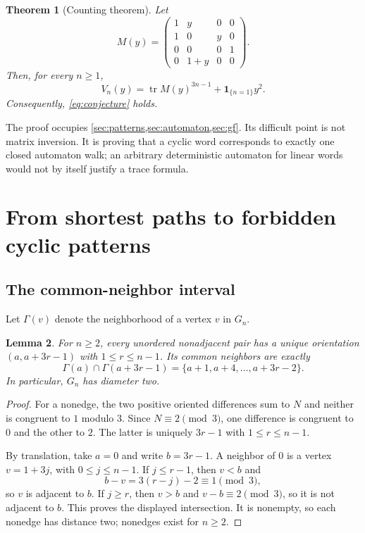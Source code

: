 \documentclass[11pt,a4paper]{article}
\newtheorem{theorem}{Theorem}[section]
\newtheorem{lemma}[theorem]{Lemma}
\theoremstyle{definition}
\newcommand{\tr}{\operatorname{tr}}
\newcommand{\Ngraph}{\Gamma}
\begin{document}
\begin{theorem}[Counting theorem]
\label{thm:main}
Let
\begin{equation}
 M(y)=\begin{pmatrix}
 1&y&0&0\\
 1&0&y&0\\
 0&0&0&1\\
 0&1+y&0&0
 \end{pmatrix}.
 \label{eq:M}
\end{equation}
Then, for every $n\ge1$,
\begin{equation}
 V_n(y)=\tr M(y)^{3n-1}+\boldsymbol{1}_{\{n=1\}}y^2.
 \label{eq:maintrace}
\end{equation}
Consequently, \cref{eq:conjecture} holds.
\end{theorem}

The proof occupies \cref{sec:patterns,sec:automaton,sec:gf}. Its difficult
point is not matrix inversion. It is proving that a cyclic word corresponds
to exactly one closed automaton walk; an arbitrary deterministic automaton
for linear words would not by itself justify a trace formula.

\section{From shortest paths to forbidden cyclic patterns}
\label{sec:patterns}

\subsection{The common-neighbor interval}

Let $\Ngraph(v)$ denote the neighborhood of a vertex $v$ in $G_n$.

\begin{lemma}
\label{lem:neighbors}
For $n\ge2$, every unordered nonadjacent pair has a unique orientation
$(a,a+3r-1)$ with $1\le r\le n-1$. Its common neighbors are exactly
\begin{equation}
 \Ngraph(a)\cap\Ngraph(a+3r-1)
   =\{a+1,a+4,\ldots,a+3r-2\}.
 \label{eq:common}
\end{equation}
In particular, $G_n$ has diameter two.
\end{lemma}

\begin{proof}
For a nonedge, the two positive oriented differences sum to $N$ and neither
is congruent to $1$ modulo $3$. Since $N\equiv2\pmod3$, one difference is
congruent to $0$ and the other to $2$. The latter is uniquely $3r-1$ with
$1\le r\le n-1$.

By translation, take $a=0$ and write $b=3r-1$. A neighbor of $0$ is a vertex
$v=1+3j$, with $0\le j\le n-1$. If $j\le r-1$, then $v<b$ and
\[
 b-v=3(r-j)-2\equiv1\pmod3,
\]
so $v$ is adjacent to $b$. If $j\ge r$, then $v>b$ and
$v-b\equiv2\pmod3$, so it is not adjacent to $b$. This proves the displayed
intersection. It is nonempty, so each nonedge has distance two; nonedges
exist for $n\ge2$.
\end{proof}
\end{document}
